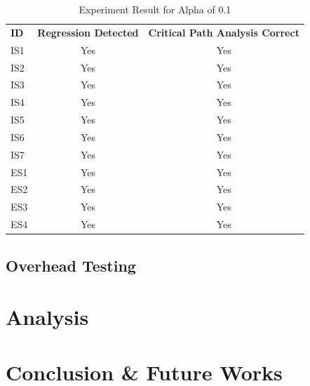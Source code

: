\documentclass[conference]{configs/IEEEtran}
\begin{document}
\begin{table}[]
	\caption{Experiment Result for Alpha of 0.1}
	\label{test-1}
	\begin{tabular}{lcc}
		\textbf{ID} & \multicolumn{1}{l}{\textbf{Regression Detected}} & \multicolumn{1}{l}{\textbf{Critical Path Analysis Correct}} \\
		IS1 & Yes & Yes \\
		IS2 & Yes & Yes \\
		IS3 & Yes & Yes \\
		IS4 & Yes & Yes \\
		IS5 & Yes & Yes \\
		IS6 & Yes & Yes \\
		IS7 & Yes & Yes \\
		ES1 & Yes & Yes \\
		ES2 & Yes & Yes \\
		ES3 & Yes & Yes \\
		ES4 & Yes & Yes
	\end{tabular}
\end{table}

\subsection{Overhead Testing}

\section{Analysis}

\section{Conclusion \& Future Works}

%




\vspace{12pt}
\end{document}

